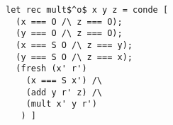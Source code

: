 \begin{figure}[!t]
  \centering
  \begin{minipage}{\columnwidth}
    \begin{lstlisting}[label={mult}, caption={Multiplication relation}, captionpos=b, frame=tb]
let rec mult$^o$ x y z = conde [
  (x === O /\ z === O);
  (y === O /\ z === O);
  (x === S O /\ z === y);
  (y === S O /\ z === x);
  (fresh (x' r')
    (x === S x') /\
    (add y r' z) /\
    (mult x' y r')
   ) ]
    \end{lstlisting}
  \end{minipage}
\end{figure}
